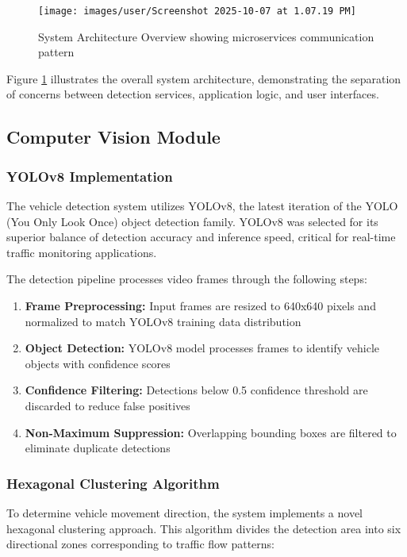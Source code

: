 \documentclass[conference]{IEEEtran}
\begin{document}
\begin{figure}[H]
\centering
\texttt{[image: images/user/Screenshot 2025-10-07 at 1.07.19 PM]}
\caption{System Architecture Overview showing microservices communication pattern}
\label{fig:architecture}
\end{figure}

Figure \ref{fig:architecture} illustrates the overall system architecture, demonstrating the separation of concerns between detection services, application logic, and user interfaces.

\subsection{Computer Vision Module}

\subsubsection{YOLOv8 Implementation}

The vehicle detection system utilizes YOLOv8, the latest iteration of the YOLO (You Only Look Once) object detection family. YOLOv8 was selected for its superior balance of detection accuracy and inference speed, critical for real-time traffic monitoring applications.

The detection pipeline processes video frames through the following steps:

\begin{enumerate}
\item \textbf{Frame Preprocessing:} Input frames are resized to 640x640 pixels and normalized to match YOLOv8 training data distribution
\item \textbf{Object Detection:} YOLOv8 model processes frames to identify vehicle objects with confidence scores
\item \textbf{Confidence Filtering:} Detections below 0.5 confidence threshold are discarded to reduce false positives
\item \textbf{Non-Maximum Suppression:} Overlapping bounding boxes are filtered to eliminate duplicate detections
\end{enumerate}

\subsubsection{Hexagonal Clustering Algorithm}

To determine vehicle movement direction, the system implements a novel hexagonal clustering approach. This algorithm divides the detection area into six directional zones corresponding to traffic flow patterns:
\end{document}
